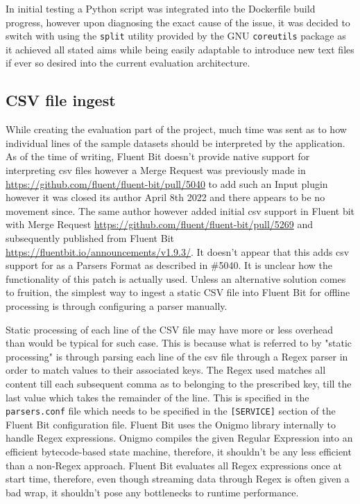 In initial testing a Python script was integrated into the Dockerfile build progress, however upon diagnosing the exact cause of the issue, it was decided to switch with using the \texttt{split} utility provided by the GNU \texttt{coreutils} package as it achieved all stated aims while being easily adaptable to introduce new text files if ever so desired into the current evaluation architecture.


\subsection{CSV file ingest}
While creating the evaluation part of the project, much time was sent as to how individual lines of the sample datasets should be interpreted by the application. As of the time of writing, Fluent Bit doesn't provide native support for interpreting \acrshort{csv} files however a Merge Request was previously made in \href{#5040}{https://github.com/fluent/fluent-bit/pull/5040} to add such an Input plugin however it was closed its author April 8th 2022 and there appears to be no movement since. The same author however added initial \acrshort{csv} support in Fluent bit with Merge Request \href{#5269}{https://github.com/fluent/fluent-bit/pull/5269} and subsequently published from Fluent Bit \href{v1.9.3}{https://fluentbit.io/announcements/v1.9.3/}. It doesn't appear that this adds \acrshort{csv} support for as a Parsers Format as described in \#5040. It is unclear how the functionality of this patch is actually used. Unless an alternative solution comes to fruition, the simplest way to ingest a static CSV file into Fluent Bit for offline processing is through configuring a parser manually.

Static processing of each line of the CSV file may have more or less overhead than would be typical for such case. This is because what is referred to by "static processing" is through parsing each line of the csv file through a Regex parser in order to match values to their associated keys. The Regex used matches all content till each subsequent comma as to belonging to the prescribed key, till the last value which takes the remainder of the line. This is specified in the \texttt{parsers.conf} file which needs to be specified in the \texttt{[SERVICE]} section of the Fluent Bit configuration file. Fluent Bit uses the Onigmo library internally to handle Regex expressions. Onigmo compiles the given Regular Expression into an efficient bytecode-based state machine\cite{Hess_2023}, therefore, it shouldn't be any less efficient than a non-Regex approach. Fluent Bit evaluates all Regex expressions once at start time, therefore, even though streaming data through Regex is often given a bad wrap, it shouldn't pose any bottlenecks to runtime performance.

